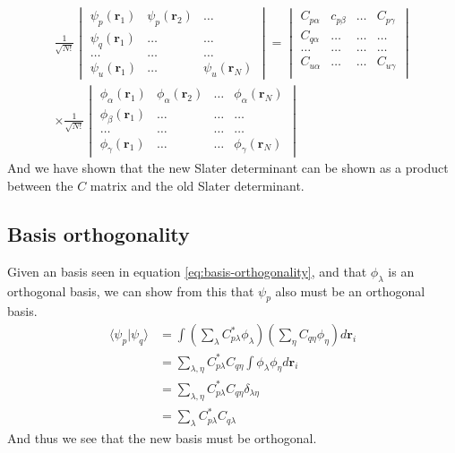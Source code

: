 \documentclass[11pt]{article}
\begin{document}
\begin{align*}
	\frac{1}{\sqrt{N!}}
	\begin{vmatrix}
		\psi_p(\mathbf{r}_1) & \psi_p(\mathbf{r}_2) & \dots \\
		\psi_q(\mathbf{r}_1) & \dots 				& \dots	\\
		\dots 				 & \dots 				& \dots \\
		\psi_u(\mathbf{r}_1) & \dots 				& \psi_u(\mathbf{r}_N)
	\end{vmatrix} = 
	\begin{vmatrix}
		C_{p\alpha} & c_{p\beta} 	& \dots 	& C_{p\gamma} \\
		C_{q\alpha} & \dots 		& \dots 	& \dots \\
		\dots 		& \dots			& \dots		& \dots \\
		C_{u\alpha} & \dots 		& \dots 	& C_{u\gamma} \\
	\end{vmatrix} \\
	\times 
	\frac{1}{\sqrt{N!}}
	\begin{vmatrix}
		\phi_\alpha(\mathbf{r}_1) & \phi_\alpha(\mathbf{r}_2) & \dots & \phi_\alpha(\mathbf{r}_N) \\
		\phi_\beta(\mathbf{r}_1) & \dots & \dots & \dots \\
		\dots & \dots & \dots & \dots \\
		\phi_\gamma(\mathbf{r}_1) & \dots & \dots & \phi_\gamma(\mathbf{r}_N)
	\end{vmatrix}
\end{align*}
And we have shown that the new Slater determinant can be shown as a product between the $C$ matrix and the old Slater determinant.

\subsection{Basis orthogonality}
Given an basis seen in equation \eqref{eq:basis-orthogonality}, and that $\phi_\lambda$ is an orthogonal basis, we can show from this that $\psi_p$ also must be an orthogonal basis.
\begin{align*}
	\langle \psi_p | \psi_q \rangle &= \int \left( \sum_\lambda C^*_{p\lambda}\phi_\lambda \right) \left( \sum_\eta C_{q\eta}\phi_\eta \right) d\mathbf{r}_i \\
	&= \sum_{\lambda,\eta} C^*_{p\lambda} C_{q\eta} \int \phi_\lambda \phi_\eta d\mathbf{r}_i \\
	&= \sum_{\lambda,\eta} C^*_{p\lambda} C_{q\eta} \delta_{\lambda\eta} \\
	&= \sum_{\lambda} C^*_{p\lambda} C_{q\lambda}
\end{align*}
And thus we see that the new basis must be orthogonal.
\end{document}
